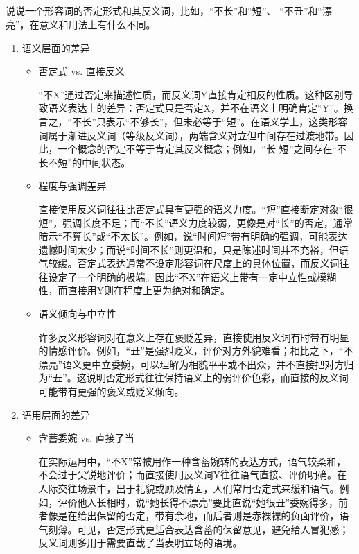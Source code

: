 \documentclass[10pt]{ctexart}
\begin{document}
\subsection{}
{\heiti
说说一个形容词的否定形式和其反义词，比如，``不长''和``短''、 ``不丑''和``漂亮''，在意义和用法上有什么不同。}

\vspace{0.5cm}

\begin{enumerate}
    \item 语义层面的差异
    \begin{itemize}
        \item 否定式 vs. 直接反义
        
        ``不X''通过否定来描述性质，而反义词Y直接肯定相反的性质。这种区别导致语义表达上的差异：否定式只是否定X，并不在语义上明确肯定``Y''。换言之，``不长''只表示``不够长''，但未必等于``短''。在语义学上，这类形容词属于渐进反义词（等级反义词），两端含义对立但中间存在过渡地带。因此，一个概念的否定不等于肯定其反义概念；例如，``长-短''之间存在``不长不短''的中间状态。

        \item 程度与强调差异
        
        直接使用反义词往往比否定式具有更强的语义力度。``短''直接断定对象``很短''，强调长度不足；而``不长''语义力度较弱，更像是对``长''的否定，通常暗示``不算长''或``不太长''。例如，说``时间短''带有明确的强调，可能表达遗憾时间太少；而说``时间不长''则更温和，只是陈述时间并不充裕，但语气较缓。否定式表达通常不设定形容词在尺度上的具体位置，而反义词往往设定了一个明确的极端。因此``不X''在语义上带有一定中立性或模糊性，而直接用Y则在程度上更为绝对和确定。

        \item 语义倾向与中立性
        
        许多反义形容词对在意义上存在褒贬差异，直接使用反义词有时带有明显的情感评价。例如，``丑''是强烈贬义，评价对方外貌难看；相比之下，``不漂亮''语义更中立委婉，可以理解为相貌平平或不出众，并不直接把对方归为``丑''。这说明否定形式往往保持语义上的弱评价色彩，而直接的反义词可能带有更强的褒义或贬义倾向。
    \end{itemize}
    
    \item 语用层面的差异
    \begin{itemize}
        \item 含蓄委婉 vs. 直接了当
        
        在实际运用中，``不X''常被用作一种含蓄婉转的表达方式，语气较柔和，不会过于尖锐地评价；而直接使用反义词Y往往语气直接、评价明确。在人际交往场景中，出于礼貌或顾及情面，人们常用否定式来缓和语气。例如，评价他人长相时，说``她长得不漂亮''要比直说``她很丑''委婉得多，前者像是在给出保留的否定，带有余地，而后者则是赤裸裸的负面评价，语气刻薄。可见，否定形式更适合表达含蓄的保留意见，避免给人冒犯感；反义词则多用于需要直截了当表明立场的语境。


\end{itemize}
\end{enumerate}
\end{document}
